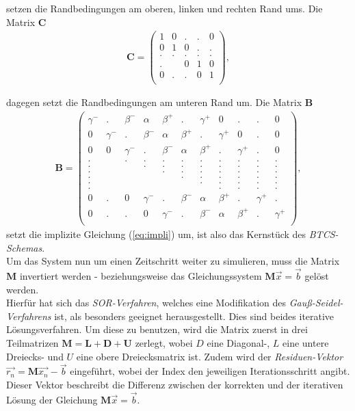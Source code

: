 \documentclass[12pt,a4paper,titlepage,headinclude,bibtotoc]{scrartcl}
\begin{document}
 setzen die Randbedingungen am oberen, linken und rechten Rand ums. Die Matrix \textbf{C}
 \begin{align*}
 \boldsymbol{C}  =
  \begin{pmatrix}
  1  & 0 & . & . & 0 \\
  0  & 1 & 0 & . & . \\
  .  & . & . & . & . \\
  .  &   & 0 & 1 & 0 \\
  0  & . & . & 0 & 1 \\
  \end{pmatrix}
  ,
\end{align*}

dagegen setzt die Randbedingungen am unteren Rand um. Die Matrix \textbf{B}
\begin{align*}
\boldsymbol{B} =
  \begin{pmatrix}
  \gamma^-  & . & \beta^- & \alpha & \beta^+ & . & \gamma^+ & 0 & .& .& 0 \\
  0  & \gamma^- & . & \beta^- & \alpha  & \beta^+  & .  & \gamma^+  & 0 &  .& 0 \\
  0  & 0 & \gamma^- & . & \beta^- & \alpha & \beta^+ & .  & \gamma^+  & .& 0 \\
  .  &   & . & . & . & . & .  & .  & .  & .  & . \\
  .  &   &   & . & . & . & . & .  & .  & .  & . \\
  .  &   &   &   & . & . & . & . & . & .  & . \\
  .  &   &   &   &   & . & . & . & . & . & .  \\
  .  &   &   &   &   &   & . & . & . & .  & . \\
  .  &   &   &   &   &   &   & . & . & .  & . \\
  0  & . & 0 & \gamma^- & . & \beta^- & \alpha & \beta^+ & .  & \gamma^+  & . \\
  0  & . & . & 0 & \gamma^- & . & \beta^- & \alpha & \beta^+ & .  & \gamma^+  \\
 \end{pmatrix}
 ,
 \end{align*}
setzt die implizite Gleichung (\ref{eq:impli}) um, ist also das Kernstück des \textit{BTCS-Schemas}.\\
Um das System nun um einen Zeitschritt weiter zu simulieren, muss die Matrix $\textbf{M}$ invertiert werden - beziehungsweise das Gleichungssystem $\textbf{M} \vec{x} = \vec{b}$ gelöst werden.\\
Hierfür hat sich das \textit{SOR-Verfahren}, welches eine Modifikation des \textit{Gauß-Seidel-Verfahrens} ist, als besonders geeignet herausgestellt. Dies sind beides iterative Lösungsverfahren. Um diese zu benutzen, wird die Matrix zuerst in drei Teilmatrizen $\boldsymbol{M}=\boldsymbol{L}+\boldsymbol{D}+\boldsymbol{U}$ zerlegt, wobei $D$ eine Diagonal-, $L$ eine untere Dreiecks- und $U$ eine obere Dreiecksmatrix ist. Zudem wird der \textit{Residuen-Vektor} $\vec{r_n} = \boldsymbol{M} \vec{x_n} - \vec{b}$ eingeführt, wobei der Index den jeweiligen Iterationsschritt angibt. Dieser Vektor beschreibt die Differenz zwischen der korrekten und der iterativen Lösung der Gleichung $\boldsymbol{M} \vec{x} = \vec{b}$.\\
\end{document}
